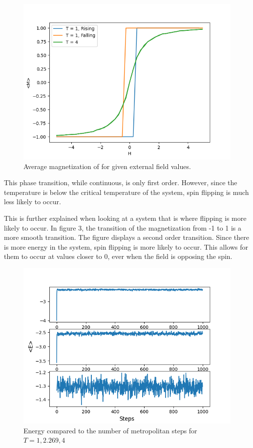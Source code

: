 \documentclass[pra,twocolumn,showpacs,amsmath,amssymb]{revtex4-2}
\begin{document}
\begin{figure}[t!]
\includegraphics[scale=0.50]{Figure_1.png}
\caption{Average magnetization of for given external field values.}\label{Poincare1}
\end{figure}

\par This phase transition, while continuous, is only first order. However, since the temperature is below the critical temperature of the system, spin flipping is much less likely to occur.
\par This is further explained when looking at a system that is where flipping is more likely to occur. In figure 3, the transition of the magnetization from -1 to 1 is a more smooth transition. The figure displays a second order transition. Since there is more energy in the system, spin flipping is more likely to occur. This allows for them to occur at values closer to 0, ever when the field is opposing the spin.

\begin{figure}[t!]
\includegraphics[scale=0.50]{e_steps.png}
\caption{Energy compared to the number of metropolitan steps for $T = 1, 2.269, 4$}\label{Poincare9}
\end{figure}
\end{document}
